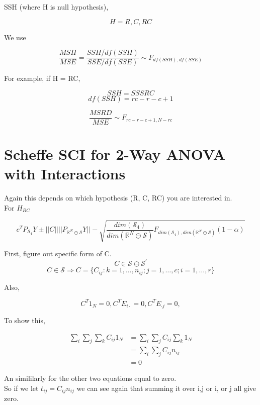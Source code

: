 \documentclass[11pt,fleqn]{book} %
\begin{document}
SSH (where H is null hypothesis), 

		$$H = R, C, RC$$

We use

		$$\frac{MSH}{MSE} = \frac{SSH/df(SSH)}{SSE/df(SSE)} \sim F_{df(SSH), df(SSE)} $$

For example, if H = RC, 

		$$SSH = SSSRC $$
		$$df(SSH) = rc - r - c +1$$

		$$\frac{MSRD}{MSE} \sim F_{rc - r - c + 1, N - rc}$$




\section{Scheffe SCI for 2-Way ANOVA with Interactions}


Again this depends on which hypothesis (R, C, RC) you are interested in. \\

For $H_{RC}$

		$$c^T P_{\mathcal{S}_4} Y \pm ||C|| ||P_{\mathbb{R}^N \ominus \mathcal{S}} Y || - \sqrt{\frac{dim(\mathcal{S}_4)}{dim(\mathbb{R}^N \ominus \mathcal{S})} F_{dim(\mathcal{S}_4), dim(\mathbb{R}^N \ominus \mathcal{S})}(1 - \alpha)} $$


First, figure out specific form of C.\\

		$$C \in \mathcal{S} \ominus \mathcal{S}^\prime $$
		$$C \in \mathcal{S} \Rightarrow C = \{C_{ij}:k = 1, \dots, n_{ij}; j = 1, \dots, c; i = 1, \dots, r  \}$$


Also, 

		$$C^T 1_N = 0, C^T E_{i \cdot} = 0, C^T E_{\cdot j} = 0, $$

To show this, 

		\begin{align*}
			\displaystyle \sum_i \sum_j \sum_k C_{ij} 1_N &= \displaystyle \sum_i \sum_j C_{ij} \sum_k 1_N\\
				&= \displaystyle \sum_i \sum_j C_{ij} n_{ij}\\
				&= 0
		\end{align*}

An simililarly for the other two equations equal to zero. \\

So if we let $t_{ij} = C_{ij} n_{ij}$ we can see again that summing it over i,j or i, or j all give zero. \\
\\
\end{document}

